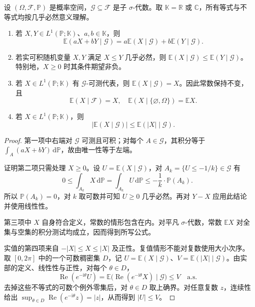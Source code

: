 \begin{proposition}[线性、正性与已知信息]\label{b1:prop:conditional-expectation-properties-31}
设 \((\Omega,\mathcal F,\mathbb P)\) 是概率空间，\(\mathcal G\subseteq\mathcal F\) 是子 \(\sigma\)-代数。取 \(\mathbb K=\mathbb R\) 或 \(\mathbb C\)，所有等式与不等式均按几乎必然意义理解。
\begin{enumerate}
 \item\label{b1:item:ce-linearity-31}若 \(X,Y\in L^1(\mathbb P;\mathbb K)\)、\(a,b\in\mathbb K\)，则
 \[
  \mathbb E(aX+bY\mid\mathcal G)
  =a\mathbb E(X\mid\mathcal G)+b\mathbb E(Y\mid\mathcal G).
 \]
 \item\label{b1:item:ce-order-31}若实可积随机变量 \(X,Y\) 满足 \(X\leq Y\) 几乎必然，则
 \(\mathbb E(X\mid\mathcal G)\leq\mathbb E(Y\mid\mathcal G)\)。特别地，\(X\geq0\) 时其条件期望非负。
 \item\label{b1:item:ce-known-31}若 \(X\in L^1(\mathbb P;\mathbb K)\) 有 \(\mathcal G\)-可测代表，则 \(\mathbb E(X\mid\mathcal G)=X\)。因此常数保持不变，且
 \[
  \mathbb E(X\mid\mathcal F)=X,\quad
  \mathbb E(X\mid\{\varnothing,\Omega\})=\mathbb E X.
 \]
 \item\label{b1:item:ce-modulus-31}若 \(X\in L^1(\mathbb P;\mathbb K)\)，则
 \begin{equation}\label{b1:eq:conditional-expectation-modulus-31}
  |\mathbb E(X\mid\mathcal G)|
  \leq\mathbb E(|X|\mid\mathcal G).
 \end{equation}
\end{enumerate}
\end{proposition}
\begin{proof}
第一项中右端对 \(\mathcal G\) 可测且可积；对每个 \(A\in\mathcal G\)，其积分等于 \(\int_A(aX+bY)\,\mathrm d\mathbb P\)，故由唯一性等于左端。

证明第二项只需处理 \(X\geq0\)。设 \(U=\mathbb E(X\mid\mathcal G)\)，对 \(A_k=\{U\leq-1/k\}\in\mathcal G\) 有
\[
 0\leq\int_{A_k}X\,\mathrm d\mathbb P
 =\int_{A_k}U\,\mathrm d\mathbb P
 \leq-\frac1k\cdot\mathbb P(A_k).
\]
所以 \(\mathbb P(A_k)=0\)，对 \(k\) 取可数并可知 \(U\geq0\) 几乎必然。再对 \(Y-X\) 应用此结论并使用线性性。

第三项中 \(X\) 自身符合定义，常数的情形包含在内。对平凡 \(\sigma\)-代数，常数 \(\mathbb E X\) 对全集与空集的积分测试均成立，因而得到所写公式。

实值的第四项来自 \(-|X|\leq X\leq|X|\) 及正性。复值情形不能对复数使用大小次序。取 \([0,2\pi]\) 中的一个可数稠密集 \(D\)，记 \(U=\mathbb E(X\mid\mathcal G)\)、\(V=\mathbb E(|X|\mid\mathcal G)\)。由实部的定义、线性性与正性，对每个 \(\theta\in D\)，
\[
 \operatorname{Re}(e^{-\mathrm i\theta}U)
 =\mathbb E\bigl(\operatorname{Re}(e^{-\mathrm i\theta}X)\mid\mathcal G\bigr)
 \leq V
 \quad\text{a.s.}
\]
去掉这些不等式的可数个例外零集后，对 \(\theta\in D\) 取上确界。对任意复数 \(z\)，连续性给出
\(\sup_{\theta\in D}\operatorname{Re}(e^{-\mathrm i\theta}z)=|z|\)，从而得到 \(|U|\leq V\)。
\end{proof}

